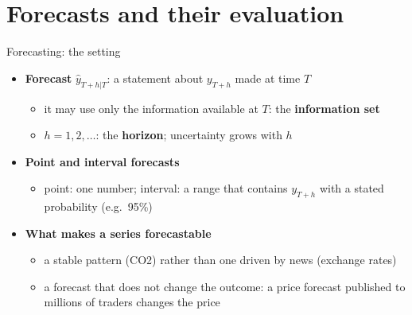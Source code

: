\section{Forecasts and their evaluation}

\begin{frame}{Forecasting: the setting}
\itemsize{\small}
\begin{itemize}
    \item \textbf{Forecast} $\hat y_{T+h|T}$: a statement about $y_{T+h}$ made at time $T$
    \begin{itemize}
        \item it may use only the information available at $T$: the \textbf{information set}
        \item $h = 1, 2, \ldots$: the \textbf{horizon}; uncertainty grows with $h$
    \end{itemize}
    \item \textbf{Point and interval forecasts}
    \begin{itemize}
        \item point: one number; interval: a range that contains $y_{T+h}$ with a stated probability (e.g.\ 95\%)
    \end{itemize}
    \item \textbf{What makes a series forecastable}
    \begin{itemize}
        \item a stable pattern (CO2) rather than one driven by news (exchange rates)
        \item a forecast that does not change the outcome: a price forecast published to millions of traders changes the price
    \end{itemize}
\end{itemize}
\end{frame}

